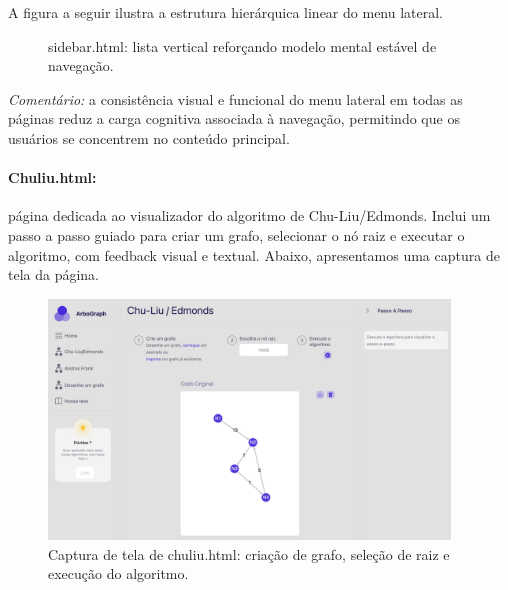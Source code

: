 \documentclass[12pt,a4paper]{article}
\def\texttt#1{#1}%
\begin{document}
A figura a seguir ilustra a estrutura hierárquica linear do menu lateral.

\begin{figure}[H]\centering
{}
\caption{\texttt{sidebar.html}: lista vertical reforçando modelo mental estável de navegação.}
\end{figure}
\textit{Comentário:} a consistência visual e funcional do menu lateral em todas as páginas reduz a carga cognitiva associada à navegação, permitindo que os usuários se concentrem no conteúdo principal.

\paragraph{\texttt{Chuliu.html}:} página dedicada ao visualizador do algoritmo de Chu-Liu/Edmonds. Inclui um passo a passo guiado para criar um grafo, selecionar o nó raiz e executar o algoritmo, com feedback visual e textual. Abaixo, apresentamos uma captura de tela da página.

\begin{figure}[H]\centering
    \includegraphics[width=0.95\textwidth]{../assets/chuliuhtml.png}
    \caption{Captura de tela de \texttt{chuliu.html}: criação de grafo, seleção de raiz e execução do algoritmo.}
    \label{fig:chuliu_html_screenshot}
\end{figure}
\end{document}
